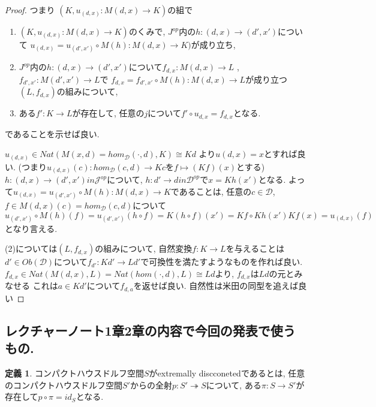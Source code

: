 \documentclass[dvipdfmx,a4paper,11pt]{article}
\theoremstyle{definition}
\newtheorem{dfn}[thm]{定義}
\begin{document}
\begin{proof}
つまり
$(K, u_{(d,x)}: M(d,x) \to K)$の組で
\begin{enumerate}
\item $(K, u_{(d,x)}: M(d,x) \to K)$のくみで, $J ^{op}$内の$h : (d,x)\to (d',x')$について
$u_{(d,x)}  = u_{(d',x')} \circ M(h) : M(d ,x) \to K)$が成り立ち, 
\item $J ^{op}$内の$h : (d,x)\to (d',x')$について$f_{d,x} : M(d,x) \to L$
, $f_{d',x'} : M(d',x') \to L$で
$f_{d,x}  = f_{d',x'}\circ M(h) : M(d,x) \to L$が成り立つ$(L, f_{d,x})$の組みについて,
\item ある$f' : K \to L$が存在して, 任意の$j$について$f' \circ u_{d,x} = f_{d,x}$となる.
\end{enumerate}
であることを示せば良い.

$u_{(d,x)} \in Nat(M(x, d)=hom_{\mathcal{D}}(\cdot, d), K) \cong Kd$
より$u{(d,x)} = x$とすれば良い. 
(つまり$u_{(d,x)}(c) : hom_{\mathcal{D}}(c, d) \to  Kc$を$f \mapsto (Kf)(x)$とする)
$h : (d,x)  \to (d',x') in \mathcal{J}^{op} $について, 
$h : d'  \to d in \mathcal{D}^{op}$で$x = Kh(x')$となる. 
よって$u_{(d,x)}  = u_{(d',x')} \circ M(h) : M(d ,x) \to K$であることは, 
任意の$c \in \mathcal{D}$, $f \in M(d ,x)(c) = hom_{\mathcal{D}}(c, d) $について
$$
u_{(d',x')} \circ M(h) (f)
= u_{(d',x')} (h \circ f) 
=K(h \circ f) (x')
=Kf\circ Kh (x')
Kf (x)=u_{(d,x)}(f) 
$$
となり言える. 

(2)については$(L, f_{d,x})$の組みについて, 
自然変換$f : K \to L$を与えることは$d' \in Ob(\mathcal{D})$について$f_{d'} : Kd' \to Ld'$で可換性を満たすようなものを作れば良い. $f_{d,x} \in Nat( M(d,x), L)=Nat( hom(\cdot,d), L)\cong Ld$より, $f_{d,x}$は$Ld$の元とみなせる
これは$a \in Kd'$について$f_{d,a}$を返せば良い. 
自然性は米田の同型を追えば良い
\end{proof}

\subsection{レクチャーノート1章2章の内容で今回の発表で使うもの.}

  
 \begin{tcolorbox}
 [colback = white, colframe = green!35!black, fonttitle = \bfseries,breakable = true]
\begin{dfn}\cite[Definition 2.4]{Sch19}
コンパクトハウスドルフ空間$S$がextremally discconetedであるとは, 任意のコンパクトハウスドルフ空間$S'$からの全射$ p : S '  \twoheadrightarrow S$について, ある$\pi : S \to S'$が存在して$p \circ \pi = id_{S}$となる. 
 \end{dfn}
 \end{tcolorbox}
 
\end{document}
